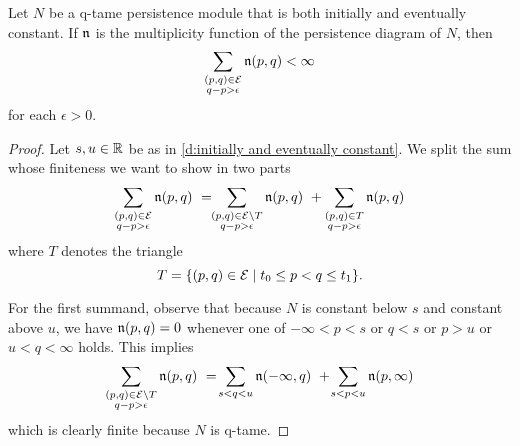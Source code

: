 \begin{thm} \label{t:cap numbers well defined}
	Let $N$ be a q-tame persistence module that is both initially and eventually constant.
	If $\mathfrak{n}$ is the multiplicity function of the persistence diagram of $N$,
	then 
	\begin{equation*}
	\sum_{ \substack{ (p,q) \in \mathcal{E} \\ q-p > \epsilon } } \mathfrak{n} (p,q) < \infty
	\end{equation*}
	for each $\epsilon > 0$.
\end{thm}

\begin{proof}
	Let $s, u \in \mathbb{R}$ be as in \cref{d:initially and eventually constant}.
	We split the sum whose finiteness we want to show in two parts
	\begin{equation*}
	\sum_{ \substack{ (p,q) \in \mathcal{E} \\ q-p > \epsilon } } \mathfrak{n} (p,q) \ = \!\!
	\sum_{ \substack{ (p,q) \in \mathcal{E} \setminus T \\ q-p > \epsilon } } \mathfrak{n} (p,q) \ +
	\sum_{ \substack{ (p,q) \in T \\ q-p > \epsilon } } \mathfrak{n} (p,q)
	\end{equation*}
	where $T$ denotes the triangle
	\begin{equation*}
	T = \{(p,q) \in \mathcal{E} \mid t_0 \leq p < q \leq t_1\}.
	\end{equation*}
	
	For the first summand, observe that because $N$ is constant below $s$ and constant above $u$, we have $\mathfrak{n}(p,q) = 0$ whenever one of $-\infty < p < s$ or $q < s$ or $p > u$ or $u < q < \infty$ holds.
	This implies 
	\begin{equation*}
	\sum_{ \substack{ (p,q) \in \mathcal{E} \setminus T \\ q-p > \epsilon } } \mathfrak{n} (p,q)
	\ = \!
	\sum_{s < q < u} \mathfrak{n} (-\infty,q)
	\ + \!
	\sum_{s < p < u} \mathfrak{n} (p, \infty)
	\end{equation*}
	which is clearly finite because $N$ is q-tame.
	

\end{proof}
